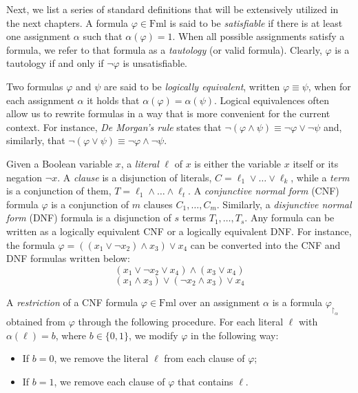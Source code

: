 Next, we list a series of standard definitions that will be extensively utilized in the next chapters. A formula $\varphi \in \mathrm{Fml}$ is said to be \textit{satisfiable} if there is at least one assignment $\alpha$ such that $\alpha(\varphi) = 1$. When all possible assignments satisfy a formula, we refer to that formula as a \textit{tautology} (or valid formula). Clearly, $\varphi$ is a tautology if and only if $\lnot \varphi$ is unsatisfiable.

Two formulas $\varphi$ and $\psi$ are said to be \textit{logically equivalent}, written $\varphi \equiv \psi$, when for each assignment $\alpha$ it holds that $\alpha(\varphi) = \alpha(\psi)$. Logical equivalences often allow us to rewrite formulas in a way that is more convenient for the current context. For instance, \textit{De Morgan's rule} states that $\lnot(\varphi \land \psi) \equiv \lnot \varphi \lor \lnot \psi$ and, similarly, that $\lnot(\varphi \lor \psi) \equiv \lnot \varphi \land \lnot \psi$.

Given a Boolean variable $x$, a \textit{literal} $\ell$ of $x$ is either the variable $x$ itself or its negation $\lnot x$. A \textit{clause} is a disjunction of literals, $C = \ell_1 \lor \ldots \lor \ell_k$, while a \textit{term} is a conjunction of them, $T = \ell_1 \land \ldots \land \ell_t$. A \textit{conjunctive normal form} (CNF) formula $\varphi$ is a conjunction of $m$ clauses $C_1, \ldots, C_m$. Similarly, a \textit{disjunctive normal form} (DNF) formula is a disjunction of $s$ terms $T_1, \ldots, T_s$. Any formula can be written as a logically equivalent CNF or a logically equivalent DNF. For instance, the formula $\varphi = ((x_1 \lor \lnot x_2) \land x_3) \lor x_4$ can be converted into the CNF and DNF formulas written below:
\begin{equation}
  \label{eq_1}
  (x_1 \lor \lnot x_2 \lor x_4) \land (x_3 \lor x_4)
\end{equation}
\begin{equation}
  \label{eq_2}
  (x_1 \land x_3) \lor (\lnot x_2 \land x_3) \lor x_4
\end{equation}

A \textit{restriction} of a CNF formula $\varphi \in \mathrm{Fml}$ over an assignment $\alpha$ is a formula $\varphi_{\upharpoonright_{\alpha}}$ obtained from $\varphi$ through the following procedure. For each literal $\ell$ with $\alpha(\ell) = b$, where $b \in \{0,1\}$, we modify $\varphi$ in the following way:
\begin{itemize}[nosep]
  \item If $b = 0$, we remove the literal $\ell$ from each clause of $\varphi$;
  \item If $b = 1$, we remove each clause of $\varphi$ that contains $\ell$.
\end{itemize}

